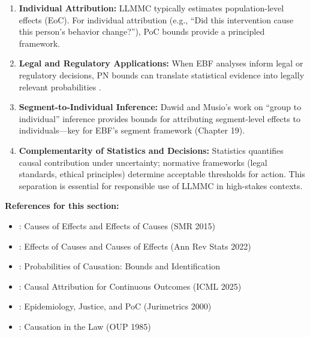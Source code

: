\begin{enumerate}
\item \textbf{Individual Attribution:}
LLMMC typically estimates population-level effects (EoC). For individual attribution
(e.g., ``Did this intervention cause this person's behavior change?''), PoC bounds
provide a principled framework.

\item \textbf{Legal and Regulatory Applications:}
When EBF analyses inform legal or regulatory decisions, PN bounds can translate
statistical evidence into legally relevant probabilities \citep{PAP-greenland2000epidemiology}.

\item \textbf{Segment-to-Individual Inference:}
Dawid and Musio's work on ``group to individual'' inference \citep{PAP-dawid2022individual}
provides bounds for attributing segment-level effects to individuals---key for
EBF's segment framework (Chapter 19).

\item \textbf{Complementarity of Statistics and Decisions:}
Statistics quantifies causal contribution under uncertainty; normative frameworks
(legal standards, ethical principles) determine acceptable thresholds for action.
This separation is essential for responsible use of LLMMC in high-stakes contexts.
\end{enumerate}

\textbf{References for this section:}
\begin{itemize}[nosep]
\item \citet{PAP-pearl2015causes}: Causes of Effects and Effects of Causes (SMR 2015)
\item \citet{PAP-dawid2022effects}: Effects of Causes and Causes of Effects (Ann Rev Stats 2022)
\item \citet{PAP-tian2000probabilities}: Probabilities of Causation: Bounds and Identification
\item \citet{PAP-luo2025attribution}: Causal Attribution for Continuous Outcomes (ICML 2025)
\item \citet{PAP-greenland2000epidemiology}: Epidemiology, Justice, and PoC (Jurimetrics 2000)
\item \citet{PAP-hart1985causation}: Causation in the Law (OUP 1985)
\end{itemize}



